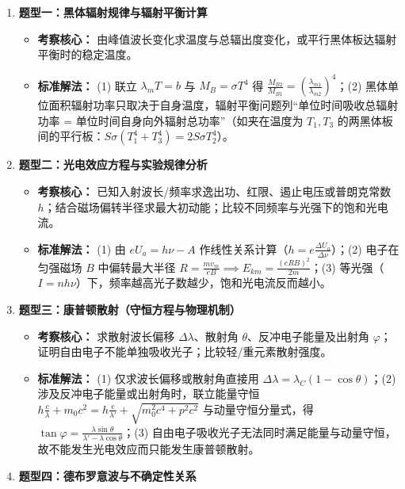 \documentclass[zihao=5,a4paper,UTF8]{ctexart}
\begin{document}
\begin{typebox}[量子力学初步常见题型分析]
\begin{enumerate}
    \item \textbf{题型一：黑体辐射规律与辐射平衡计算}
    \begin{itemize}
        \item \textbf{考察核心：} 由峰值波长变化求温度与总辐出度变化，或平行黑体板达辐射平衡时的稳定温度。
        \item \textbf{标准解法：} (1) 联立 $\lambda_m T = b$ 与 $M_B = \sigma T^4$ 得 $\frac{M_{B2}}{M_{B1}} = \left(\frac{\lambda_{m1}}{\lambda_{m2}}\right)^4$；(2) 黑体单位面积辐射功率只取决于自身温度，辐射平衡问题列“单位时间吸收总辐射功率 = 单位时间自身向外辐射总功率”（如夹在温度为 $T_1, T_3$ 的两黑体板间的平行板：$S\sigma(T_1^4 + T_3^4) = 2S\sigma T_2^4$）。
    \end{itemize}
    \item \textbf{题型二：光电效应方程与实验规律分析}
    \begin{itemize}
        \item \textbf{考察核心：} 已知入射波长/频率求逸出功、红限、遏止电压或普朗克常数 $h$；结合磁场偏转半径求最大初动能；比较不同频率与光强下的饱和光电流。
        \item \textbf{标准解法：} (1) 由 $eU_a = h\nu - A$ 作线性关系计算（$h = e\frac{\Delta U_a}{\Delta\nu}$）；(2) 电子在匀强磁场 $B$ 中偏转最大半径 $R = \frac{mv_m}{eB} \implies E_{km} = \frac{(eRB)^2}{2m}$；(3) 等光强（$I = n h\nu$）下，频率越高光子数越少，饱和光电流反而越小。
    \end{itemize}
    \item \textbf{题型三：康普顿散射（守恒方程与物理机制）}
    \begin{itemize}
        \item \textbf{考察核心：} 求散射波长偏移 $\Delta\lambda$、散射角 $\theta$、反冲电子能量及出射角 $\varphi$；证明自由电子不能单独吸收光子；比较轻/重元素散射强度。
        \item \textbf{标准解法：} (1) 仅求波长偏移或散射角直接用 $\Delta\lambda = \lambda_C(1-\cos\theta)$；(2) 涉及反冲电子能量或出射角时，联立能量守恒 $h\frac{c}{\lambda} + m_0 c^2 = h\frac{c}{\lambda'} + \sqrt{m_0^2 c^4 + p^2 c^2}$ 与动量守恒分量式，得 $\tan\varphi = \frac{\lambda\sin\theta}{\lambda' - \lambda\cos\theta}$；(3) 自由电子吸收光子无法同时满足能量与动量守恒，故不能发生光电效应而只能发生康普顿散射。
    \end{itemize}
    \item \textbf{题型四：德布罗意波与不确定性关系}

\end{enumerate}
\end{typebox}
\end{document}
